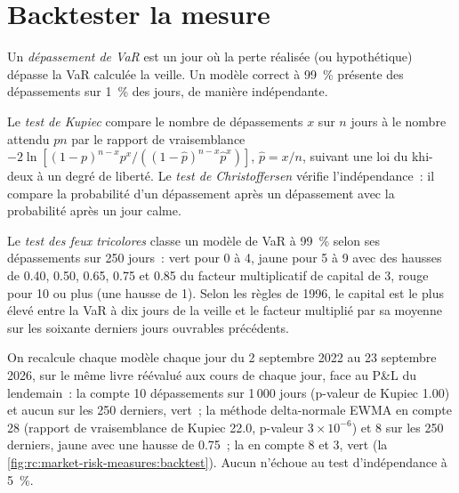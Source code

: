 \section{Backtester la mesure}

\begin{definition}\label{def:rc:market-risk-measures:exception}
Un \emph{dépassement de VaR} est un jour où la perte réalisée (ou hypothétique)
dépasse la VaR calculée la veille. Un modèle correct à 99~\% présente des dépassements sur 1~\% des jours,
de manière indépendante.
\end{definition}

\begin{definition}\label{def:rc:market-risk-measures:tests}
Le \emph{test de Kupiec} compare le nombre de dépassements $x$ sur $n$ jours à
le nombre attendu $pn$ par le rapport de vraisemblance $-2\ln[(1-p)^{n-x}p^x/((1-\hat p)^{n-x}\hat p^x)]$, $\hat p = x/n$,
suivant une loi du khi-deux à un degré de liberté. Le \emph{test de Christoffersen}
vérifie l'indépendance~: il compare la probabilité d'un dépassement après un dépassement avec la
probabilité après un jour calme.
\end{definition}

\begin{definition}\label{def:rc:market-risk-measures:traffic}
Le \emph{test des feux tricolores} classe un modèle de VaR à 99~\% selon ses
dépassements sur 250 jours~: vert pour 0 à 4, jaune pour 5 à 9 avec des hausses de 0.40, 0.50,
0.65, 0.75 et 0.85 du facteur multiplicatif de capital de 3, rouge pour 10 ou plus (une hausse
de 1). Selon les règles de 1996, le capital est le plus élevé entre la VaR à dix jours de la veille et le facteur multiplié
par sa moyenne sur les soixante derniers jours ouvrables précédents.
\end{definition}

\label{lst:rc:market-risk-measures:backtest}

\begin{example}\label{ex:rc:market-risk-measures:backtest}
On recalcule chaque modèle chaque jour du 2 septembre 2022 au 23 septembre 2026, sur le même livre
réévalué aux cours de chaque jour, face au P\&L du lendemain~: la  compte 10
dépassements sur 1\,000 jours (p-valeur de Kupiec 1.00) et aucun sur les 250 derniers, vert~; la
méthode delta-normale EWMA en compte 28 (rapport de vraisemblance de Kupiec 22.0, p-valeur $3\times10^{-6}$) et 8 sur les
250 derniers, jaune avec une hausse de 0.75~; la  en compte 8 et 3, vert
(la \cref{fig:rc:market-risk-measures:backtest}). Aucun n'échoue au test d'indépendance à 5~\%.
\end{example}

